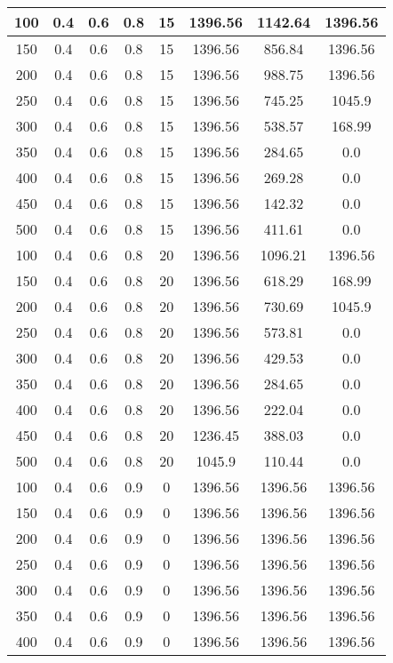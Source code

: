 \documentclass[a4paper, 12pt]{extreport}
\begin{document}
\begin{itemize}
\begin{longtable}{|c|c|c|c|c|c|c|c|}
			100 & 0.4 & 0.6 & 0.8 & 15 & 1396.56 & 1142.64 & 1396.56 \\\hline
			150 & 0.4 & 0.6 & 0.8 & 15 & 1396.56 & 856.84 & 1396.56 \\\hline
			200 & 0.4 & 0.6 & 0.8 & 15 & 1396.56 & 988.75 & 1396.56 \\\hline
			250 & 0.4 & 0.6 & 0.8 & 15 & 1396.56 & 745.25 & 1045.9 \\\hline
			300 & 0.4 & 0.6 & 0.8 & 15 & 1396.56 & 538.57 & 168.99 \\\hline
			350 & 0.4 & 0.6 & 0.8 & 15 & 1396.56 & 284.65 & 0.0 \\\hline
			400 & 0.4 & 0.6 & 0.8 & 15 & 1396.56 & 269.28 & 0.0 \\\hline
			450 & 0.4 & 0.6 & 0.8 & 15 & 1396.56 & 142.32 & 0.0 \\\hline
			500 & 0.4 & 0.6 & 0.8 & 15 & 1396.56 & 411.61 & 0.0 \\\hline
			100 & 0.4 & 0.6 & 0.8 & 20 & 1396.56 & 1096.21 & 1396.56 \\\hline
			150 & 0.4 & 0.6 & 0.8 & 20 & 1396.56 & 618.29 & 168.99 \\\hline
			200 & 0.4 & 0.6 & 0.8 & 20 & 1396.56 & 730.69 & 1045.9 \\\hline
			250 & 0.4 & 0.6 & 0.8 & 20 & 1396.56 & 573.81 & 0.0 \\\hline
			300 & 0.4 & 0.6 & 0.8 & 20 & 1396.56 & 429.53 & 0.0 \\\hline
			350 & 0.4 & 0.6 & 0.8 & 20 & 1396.56 & 284.65 & 0.0 \\\hline
			400 & 0.4 & 0.6 & 0.8 & 20 & 1396.56 & 222.04 & 0.0 \\\hline
			450 & 0.4 & 0.6 & 0.8 & 20 & 1236.45 & 388.03 & 0.0 \\\hline
			500 & 0.4 & 0.6 & 0.8 & 20 & 1045.9 & 110.44 & 0.0 \\\hline
			100 & 0.4 & 0.6 & 0.9 & 0 & 1396.56 & 1396.56 & 1396.56 \\\hline
			150 & 0.4 & 0.6 & 0.9 & 0 & 1396.56 & 1396.56 & 1396.56 \\\hline
			200 & 0.4 & 0.6 & 0.9 & 0 & 1396.56 & 1396.56 & 1396.56 \\\hline
			250 & 0.4 & 0.6 & 0.9 & 0 & 1396.56 & 1396.56 & 1396.56 \\\hline
			300 & 0.4 & 0.6 & 0.9 & 0 & 1396.56 & 1396.56 & 1396.56 \\\hline
			350 & 0.4 & 0.6 & 0.9 & 0 & 1396.56 & 1396.56 & 1396.56 \\\hline
			400 & 0.4 & 0.6 & 0.9 & 0 & 1396.56 & 1396.56 & 1396.56 \\\hline

\end{longtable}
\end{itemize}
\end{document}
